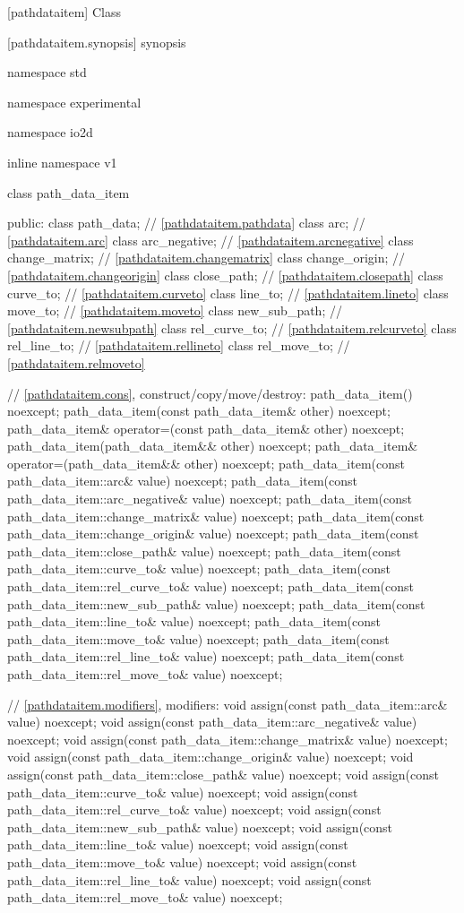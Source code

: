  [pathdataitem] {Class }

 [pathdataitem.synopsis] { synopsis}

\begin{codeblock}
namespace std { namespace experimental { namespace io2d { inline namespace v1 {
  class path_data_item {
  public:
    class path_data;			// \ref{pathdataitem.pathdata}
    class arc;				// \ref{pathdataitem.arc}
    class arc_negative;			// \ref{pathdataitem.arcnegative}
    class change_matrix;		// \ref{pathdataitem.changematrix}
    class change_origin;		// \ref{pathdataitem.changeorigin}
    class close_path;			// \ref{pathdataitem.closepath}
    class curve_to;			// \ref{pathdataitem.curveto}
    class line_to;			// \ref{pathdataitem.lineto}
    class move_to;			// \ref{pathdataitem.moveto}
    class new_sub_path;			// \ref{pathdataitem.newsubpath}
    class rel_curve_to;			// \ref{pathdataitem.relcurveto}
    class rel_line_to;			// \ref{pathdataitem.rellineto}
    class rel_move_to;			// \ref{pathdataitem.relmoveto}
    
    // \ref{pathdataitem.cons}, construct/copy/move/destroy:
    path_data_item() noexcept;
    path_data_item(const path_data_item& other) noexcept;
    path_data_item& operator=(const path_data_item& other) noexcept;
    path_data_item(path_data_item&& other) noexcept;
    path_data_item& operator=(path_data_item&& other) noexcept;
    path_data_item(const path_data_item::arc& value) noexcept;
    path_data_item(const path_data_item::arc_negative& value) noexcept;
    path_data_item(const path_data_item::change_matrix& value) noexcept;
    path_data_item(const path_data_item::change_origin& value) noexcept;
    path_data_item(const path_data_item::close_path& value) noexcept;
    path_data_item(const path_data_item::curve_to& value) noexcept;
    path_data_item(const path_data_item::rel_curve_to& value) noexcept;
    path_data_item(const path_data_item::new_sub_path& value) noexcept;
    path_data_item(const path_data_item::line_to& value) noexcept;
    path_data_item(const path_data_item::move_to& value) noexcept;
    path_data_item(const path_data_item::rel_line_to& value) noexcept;
    path_data_item(const path_data_item::rel_move_to& value) noexcept;

    // \ref{pathdataitem.modifiers}, modifiers:
    void assign(const path_data_item::arc& value) noexcept;
    void assign(const path_data_item::arc_negative& value) noexcept;
    void assign(const path_data_item::change_matrix& value) noexcept;
    void assign(const path_data_item::change_origin& value) noexcept;
    void assign(const path_data_item::close_path& value) noexcept;
    void assign(const path_data_item::curve_to& value) noexcept;
    void assign(const path_data_item::rel_curve_to& value) noexcept;
    void assign(const path_data_item::new_sub_path& value) noexcept;
    void assign(const path_data_item::line_to& value) noexcept;
    void assign(const path_data_item::move_to& value) noexcept;
    void assign(const path_data_item::rel_line_to& value) noexcept;
    void assign(const path_data_item::rel_move_to& value) noexcept;

}}}}}
\end{codeblock}
